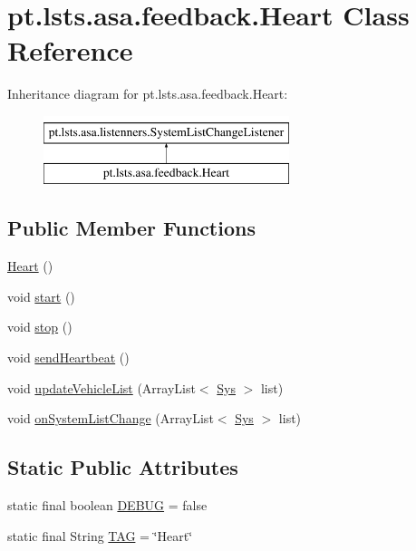 \hypertarget{classpt_1_1lsts_1_1asa_1_1feedback_1_1Heart}{}\section{pt.\+lsts.\+asa.\+feedback.\+Heart Class Reference}
\label{classpt_1_1lsts_1_1asa_1_1feedback_1_1Heart}
Inheritance diagram for pt.\+lsts.\+asa.\+feedback.\+Heart\+:\begin{figure}[H]
\begin{center}
\leavevmode
\includegraphics[height=2.000000cm]{classpt_1_1lsts_1_1asa_1_1feedback_1_1Heart}
\end{center}
\end{figure}
\subsection*{Public Member Functions}
\begin{DoxyCompactItemize}
\item 
\hyperlink{classpt_1_1lsts_1_1asa_1_1feedback_1_1Heart_aabc08ff8c392df8d7ae3fd8c95f22853}{Heart} ()
\item 
void \hyperlink{classpt_1_1lsts_1_1asa_1_1feedback_1_1Heart_adf7c3d62caa26711673a5ba77b952c9d}{start} ()
\item 
void \hyperlink{classpt_1_1lsts_1_1asa_1_1feedback_1_1Heart_adc1a93acd4f7fdf1f4da59d4601ae63a}{stop} ()
\item 
void \hyperlink{classpt_1_1lsts_1_1asa_1_1feedback_1_1Heart_a8bd7463070203ac675a5324f641853d3}{send\+Heartbeat} ()
\item 
void \hyperlink{classpt_1_1lsts_1_1asa_1_1feedback_1_1Heart_a88155a7e1448b5a97319db9483d8ef21}{update\+Vehicle\+List} (Array\+List$<$ \hyperlink{classpt_1_1lsts_1_1asa_1_1sys_1_1Sys}{Sys} $>$ list)
\item 
void \hyperlink{classpt_1_1lsts_1_1asa_1_1feedback_1_1Heart_a9147fa87f887be1cc0b10ce1d6884421}{on\+System\+List\+Change} (Array\+List$<$ \hyperlink{classpt_1_1lsts_1_1asa_1_1sys_1_1Sys}{Sys} $>$ list)
\end{DoxyCompactItemize}
\subsection*{Static Public Attributes}
\begin{DoxyCompactItemize}
\item 
static final boolean \hyperlink{classpt_1_1lsts_1_1asa_1_1feedback_1_1Heart_a7848f15d495eb933a5b17c03e9220a07}{D\+E\+B\+U\+G} = false
\item 
static final String \hyperlink{classpt_1_1lsts_1_1asa_1_1feedback_1_1Heart_ab6cf7d0de40636252d542f1616e36171}{T\+A\+G} = \char`\"{}Heart\char`\"{}
\end{DoxyCompactItemize}


